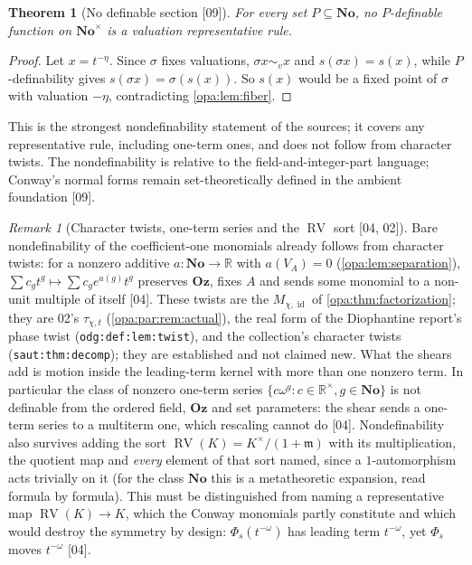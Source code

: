 \documentclass[11pt,oneside]{article}
\numberwithin{equation}{section}
\newtheorem{theorem}{Theorem}[section]
\theoremstyle{definition}
\theoremstyle{remark}
\newtheorem{remark}[remark]{Remark}
\newcommand{\No}{\mathbf{No}}
\newcommand{\Oz}{\mathbf{Oz}}
\newcommand{\R}{\mathbb R}
\newcommand{\mm}{\mathfrak m}
\newcommand{\id}{\operatorname{id}}
\newcommand{\RV}{\operatorname{RV}}
\newcommand{\src}[1]{\textup{\textsf{\small[#1]}}}
\newcommand{\lbl}[1]{\nolinkurl{#1}}
\begin{document}
\begin{theorem}[No definable section \src{09}]\label{opa:thm:nosection}
For every set $P\subseteq\No$, no $P$-definable function on $\No^\times$ is a
valuation representative rule.
\end{theorem}
\begin{proof}
Let $x=t^{-\eta}$. Since $\sigma$ fixes valuations, $\sigma x\sim_vx$ and
$s(\sigma x)=s(x)$, while $P$-definability gives $s(\sigma x)=\sigma(s(x))$. So $s(x)$
would be a fixed point of $\sigma$ with valuation $-\eta$, contradicting
\cref{opa:lem:fiber}.
\end{proof}

This is the strongest nondefinability statement of the sources; it covers any
representative rule, including one-term ones, and does not follow from character
twists. The nondefinability is relative to the field-and-integer-part language;
Conway's normal forms remain set-theoretically defined in the ambient foundation
\src{09}.

\begin{remark}[Character twists, one-term series and the $\RV$ sort \src{04, 02}]\label{opa:rem:twists}
Bare nondefinability of the coefficient-one monomials already follows from
character twists: for a nonzero additive $a:\No\to\R$ with $a(V_A)=0$
(\cref{opa:lem:separation}), $\sum c_gt^g\mapsto\sum c_ge^{a(g)}t^g$ preserves $\Oz$,
fixes $A$ and sends some monomial to a non-unit multiple of itself \src{04}. These
twists are the $M_{\chi,\id}$ of \cref{opa:thm:factorization}; they are 02's
$\tau_{\chi,t}$ (\cref{opa:par:rem:actual}), the real form of the Diophantine
report's phase twist (\lbl{odg:def:lem:twist}), and the collection's character
twists (\lbl{saut:thm:decomp}); they are established and not claimed new. What
the shears add is motion inside the leading-term kernel with more than one
nonzero term. In particular the class of nonzero one-term series
$\{c\omega^g:c\in\R^\times,g\in\No\}$ is not definable from the ordered field,
$\Oz$ and set parameters: the shear sends a one-term series to a multiterm one,
which rescaling cannot do \src{04}. Nondefinability also survives adding the sort
$\RV(K)=K^\times/(1+\mm)$ with its multiplication, the quotient map and \emph{every}
element of that sort named, since a $1$-automorphism acts trivially on it (for the
class $\No$ this is a metatheoretic expansion, read formula by formula). This
must be distinguished from naming a representative map $\RV(K)\to K$, which the
Conway monomials partly constitute and which would destroy the symmetry by design:
$\Phi_s(t^{-\omega})$ has leading term $t^{-\omega}$, yet $\Phi_s$ moves $t^{-\omega}$
\src{04}.
\end{remark}
\end{document}
